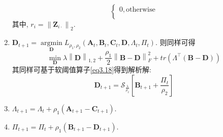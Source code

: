 \documentclass[lang=cn,10pt]{gorgeousnbook}
\numberwithin{equation}{section}%
\numberwithin{figure}{section}%
\begin{document}
\begin{enumerate}[1)]
\begin{equation}
\begin{cases}
        0,             \mathrm{otherwise}\\
    \end{cases}\label{eq3.18}
    \end{equation}
    其中, $r_i=\left\| \boldsymbol{Z}_{i\cdot} \right\| _2$.
    \item $\boldsymbol{D}_{t+1}=\mathop {arg\min} \limits_{\bm{D}}L_{\rho _1,\rho _2}\left( \boldsymbol{A}_t,\boldsymbol{B}_t,\boldsymbol{C}_t,\boldsymbol{D},\boldsymbol{\varLambda }_t,\boldsymbol{\varPi }_t \right)$. 则同样可得
    \begin{equation}
        \min_{\boldsymbol{D}} \lambda \left\| \boldsymbol{D} \right\| _{1,2}+\frac{\rho _1}{2}\left\| \boldsymbol{B}-\boldsymbol{D} \right\| _{F}^{2}+tr\left( \boldsymbol{\varLambda }^{\top}\left( \boldsymbol{B}-\boldsymbol{D} \right) \right) 
    \end{equation}
    其同样可基于软阈值算子\eqref{eq3.18}得到解析解:
    \begin{equation}
        \boldsymbol{D}_{t+1}=\mathcal{S} _{\frac{\lambda}{\rho _2}}\left[ \boldsymbol{B}_{t+1}+\frac{\boldsymbol{\varPi }_t}{\rho _2} \right] 
    \end{equation}
    \item $\boldsymbol{\varLambda }_{t+1} = \boldsymbol{\varLambda }_t+\rho_1(\bm{A}_{t+1}-\bm{C}_{t+1})$.
    \item $\boldsymbol{\varPi }_{t+1} = \boldsymbol{\varPi }_t+\rho_1(\bm{B}_{t+1}-\bm{D}_{t+1})$.
\end{enumerate}
\end{document}
